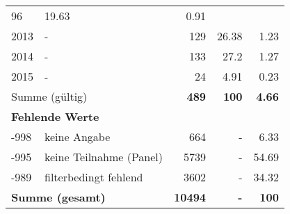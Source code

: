 \begin{longtable}{lXrrr}
       \num{96} &
       \num[round-mode=places,round-precision=2]{19.63} &
         \num[round-mode=places,round-precision=2]{0.91} \\

     2013 &
     \multicolumn{1}{X}{ -  } &


       \num{129} &
       \num[round-mode=places,round-precision=2]{26.38} &
         \num[round-mode=places,round-precision=2]{1.23} \\

     2014 &
     \multicolumn{1}{X}{ -  } &


       \num{133} &
       \num[round-mode=places,round-precision=2]{27.2} &
         \num[round-mode=places,round-precision=2]{1.27} \\

     2015 &
     \multicolumn{1}{X}{ -  } &


       \num{24} &
       \num[round-mode=places,round-precision=2]{4.91} &
         \num[round-mode=places,round-precision=2]{0.23} \\
     \midrule
     \multicolumn{2}{l}{Summe (gültig)} &
       \textbf{\num{489}} &
     \textbf{\num{100}} &
       \textbf{\num[round-mode=places,round-precision=2]{4.66}} \\
     \multicolumn{5}{l}{\textbf{Fehlende Werte}}\\
       -998 &
       keine Angabe &
         \num{664} &
        - &
         \num[round-mode=places,round-precision=2]{6.33} \\
       -995 &
       keine Teilnahme (Panel) &
         \num{5739} &
        - &
         \num[round-mode=places,round-precision=2]{54.69} \\
       -989 &
       filterbedingt fehlend &
         \num{3602} &
        - &
         \num[round-mode=places,round-precision=2]{34.32} \\
     \midrule
     \multicolumn{2}{l}{\textbf{Summe (gesamt)}} &
          \textbf{\num{10494}} &
        \textbf{-} &
        \textbf{\num{100}} \\
     \bottomrule
     \end{longtable}
     
